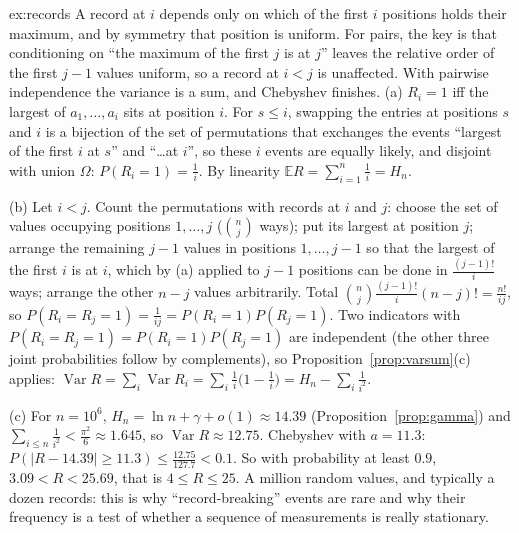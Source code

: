 \begin{solution}{ex:records}
\idea A record at $i$ depends only on which of the first $i$ positions holds their maximum, and by symmetry that position is uniform. For pairs, the key is that conditioning on ``the maximum of the first $j$ is at $j$'' leaves the relative order of the first $j-1$ values uniform, so a record at $i<j$ is unaffected. With pairwise independence the variance is a sum, and Chebyshev finishes.
\writeup (a) $R_i=1$ iff the largest of $a_1,\dots,a_i$ sits at position $i$. For $s\le i$, swapping the entries at positions $s$ and $i$ is a bijection of the set of permutations that exchanges the events ``largest of the first $i$ at $s$'' and ``\dots at $i$'', so these $i$ events are equally likely, and disjoint with union $\Omega$: $P(R_i=1)=\frac1i$. By linearity $\mathbb ER=\sum_{i=1}^n\frac1i=H_n$.

(b) Let $i<j$. Count the permutations with records at $i$ and $j$: choose the set of values occupying positions $1,\dots,j$ ($\binom nj$ ways); put its largest at position $j$; arrange the remaining $j-1$ values in positions $1,\dots,j-1$ so that the largest of the first $i$ is at $i$, which by (a) applied to $j-1$ positions can be done in $\frac{(j-1)!}i$ ways; arrange the other $n-j$ values arbitrarily. Total $\binom nj\frac{(j-1)!}i(n-j)!=\frac{n!}{ij}$, so $P(R_i=R_j=1)=\frac1{ij}=P(R_i=1)P(R_j=1)$. Two indicators with $P(R_i=R_j=1)=P(R_i=1)P(R_j=1)$ are independent (the other three joint probabilities follow by complements), so Proposition~\ref{prop:varsum}(c) applies: $\operatorname{Var}R=\sum_i\operatorname{Var}R_i=\sum_i\frac1i\big(1-\frac1i\big)=H_n-\sum_i\frac1{i^2}$.

(c) For $n=10^6$, $H_n=\ln n+\gamma+o(1)\approx14.39$ (Proposition~\ref{prop:gamma}) and $\sum_{i\le n}\frac1{i^2}<\frac{\pi^2}6\approx1.645$, so $\operatorname{Var}R\approx12.75$. Chebyshev with $a=11.3$: $P(|R-14.39|\ge11.3)\le\frac{12.75}{127.7}<0.1$. So with probability at least $0.9$, $3.09<R<25.69$, that is $4\le R\le25$. A million random values, and typically a dozen records: this is why ``record-breaking'' events are rare and why their frequency is a test of whether a sequence of measurements is really stationary.
\end{solution}

